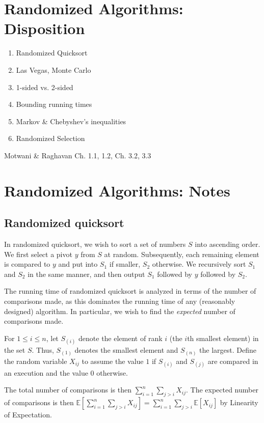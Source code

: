 \section{Randomized Algorithms: Disposition}
\begin{enumerate}
	\item Randomized Quicksort
	\item Las Vegas, Monte Carlo
	\item 1-sided vs. 2-sided
	\item Bounding running times
	\item Markov \& Chebyshev's inequalities
	\item Randomized Selection
\end{enumerate}

Motwani \& Raghavan Ch. 1.1, 1.2, Ch. 3.2, 3.3

\section{Randomized Algorithms: Notes}

\subsection{Randomized quicksort}
In randomized quicksort, we wish to sort a set of numbers $S$ into ascending
order. We first select a pivot $y$ from $S$ at random. Subsequently, each
remaining element is compared to $y$ and put into $S_1$ if smaller, $S_2$
otherwise. We recursively sort $S_1$ and $S_2$ in the same manner, and then
output $S_1$ followed by $y$ followed by $S_2$.

The running time of randomized quicksort is analyzed in terms of the number of
comparisons made, as this dominates the running time of any (reasonably designed)
algorithm. In particular, we wish to find the \textit{expected} number of comparisons
made.

For $1 \leq i \leq n$, let $S_{(i)}$ denote the element of rank $i$ (the $i$th smallest element)
in the set $S$. Thus, $S_{(1)}$ denotes the smallest element and $S_{(n)}$ the largest. Define the
random variable $X_{ij}$ to assume the value $1$ if $S_{(i)}$ and $S_{(j)}$ are compared in an execution
and the value $0$ otherwise.

The total number of comparisons is then $\sum_{i=1}^n \sum_{j>i} X_{ij}$. The expected number of comparisons is
then $\mathbb{E}[\sum_{i=1}^n \sum_{j>i} X_{ij}] = \sum_{i=1}^n \sum_{j>i} \mathbb{E}[X_{ij}]$ by Linearity
of Expectation.


